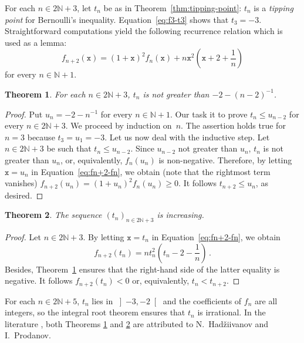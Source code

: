 \documentclass[12pt]{article}
\newcommand{\bN}{\mathbb{N}}
\newcommand{\ttx}{\mathtt{x}}
\newtheorem{theorem}{Theorem}
\begin{document}
 For each $n \in 2 \bN + 3$,
 let $t_n$ be as in Theorem~\ref{thm:tipping-point}:
 $t_n$ is a \emph{tipping point} for Bernoulli's inequality.
 Equation~\eqref{eq:f3-t3} shows that $t_3 = - 3$. 
 Straightforward computations yield the following recurrence relation which is used as a lemma:
 \begin{equation} \label{eq:fn+2-fn}
   f_{n + 2} (\ttx) = {(1 + \ttx)}^2 f_n(\ttx) + n \ttx^2 \left(\ttx + 2 + \frac{1}{n} \right)
 \end{equation}
 for every $n \in \bN + 1$.
 
 \begin{theorem} \label{thm:HP-upper}
   For each $n \in 2 \bN + 3$, $t_n$ is not greater than $- 2 - {(n - 2)}^{-1}$.
 \end{theorem}

 \begin{proof}
   Put $u_n = - 2 - n^{-1}$ for every $n \in \bN + 1$.
   Our task it to prove $t_n \le u_{n - 2}$ for every $n \in 2 \bN + 3$.
   We proceed by induction on~$n$.
   The assertion holds true for $n = 3$ because $t_3 = u_1 = - 3$.
   Let us now deal with the inductive step.
   Let $n \in 2 \bN + 3$ be such that $t_n \le u_{n - 2}$.
   Since $u_{n - 2}$ not greater than $u_n$, $t_n$ is not greater than $u_n$, or, equivalently, $f_n(u_n)$ is non-negative.
   Therefore,  
   by letting $\ttx = u_n$ in Equation~\eqref{eq:fn+2-fn}, we obtain (note that the rightmost term vanishes)
   $f_{n + 2}(u_n) = {( 1 + u_n )}^2 f_n(u_n) \ge 0$.
   It follows $t_{n + 2} \le u_n$, as desired.
 \end{proof}
 
 
 
\begin{theorem} \label{thm:HP-tn-increase} 
  The sequence $\left( t_n \right)_{n \in 2 \bN + 3}$ is increasing.
 \end{theorem} 

 \begin{proof}
 Let $n \in 2 \bN + 3$.
 By letting $\ttx = t_n$ in Equation~\eqref{eq:fn+2-fn}, we obtain
 $$ 
f_{n + 2} (t_n) = n t_n^2 \left(t_n - 2 - \frac{1}{n} \right) \, .
$$
Besides, Theorem~\ref{thm:HP-upper} ensures that the right-hand side of the latter equality is negative.
It follows $f_{n + 2} (t_n) < 0$ or, equivalently, $t_n < t_{n + 2}$.
\end{proof}

For each $n \in 2 \bN + 5$, $t_n$ lies in $\left]- 3, - 2 \right[$ and the coefficients of $f_n$ are all integers,
so the integral root theorem ensures that $t_n$ is irrational.
 In the literature \cite{MitrinovicCNIA, MitrinovicAI, MitrinovicP93, MondP94},
 both Theorems \ref{thm:HP-upper} and \ref{thm:HP-tn-increase} are attributed to N.~Had\v{z}iivanov and I.~Prodanov.
\end{document}
